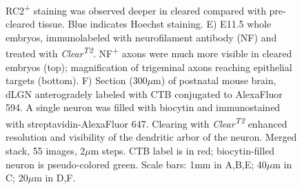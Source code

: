 \begin{figure}[hbtp]
\begin{center}
{		RC2\textsuperscript{+} staining was observed deeper in cleared compared with pre-cleared tissue.
		Blue indicates Hoechst staining.
		E) E11.5 whole embryos, immunolabeled with neurofilament antibody (NF) and treated with \emph{Clear\textsuperscript{T2}}.
		NF\textsuperscript{+} axons were much more visible in cleared embryos (top); magnification of trigeminal axons reaching epithelial targets (bottom).
		F) Section (300$\mu$m) of postnatal mouse brain, dLGN anterogradely labeled with CTB conjugated to AlexaFluor 594.
		A single neuron was filled with biocytin and immunostained with streptavidin-AlexaFluor 647.
		Clearing with \emph{Clear\textsuperscript{T2}} enhanced resolution and visibility of the dendritic arbor of the neuron.
		Merged stack, 55 images, 2$\mu$m steps.
		CTB label is in red; biocytin-filled neuron is pseudo-colored green. Scale bars: 1mm in A,B,E; 40$\mu$m in C; 20$\mu$m in D,F.
		}
        \label{ClearT_Fig3}
    \end{center}
\end{figure}

